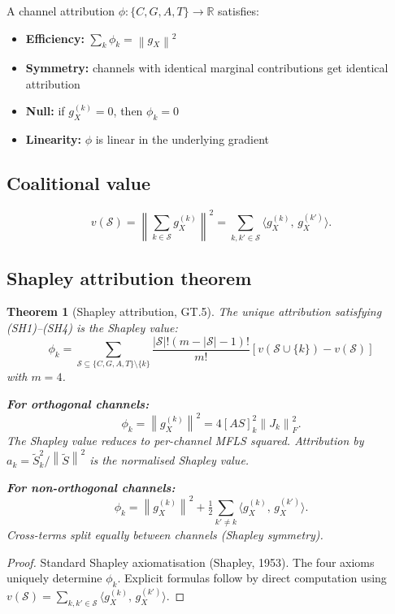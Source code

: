 \documentclass[11pt,a4paper]{article}
\newtheorem{theorem}{Theorem}[section]
\theoremstyle{definition}
\newcommand{\R}{\mathbb{R}}
\newcommand{\norm}[1]{\left\|#1\right\|}
\newcommand{\inner}[2]{\langle #1,\,#2\rangle}
\newcommand{\gX}{g_X}
\newcommand{\half}{\tfrac{1}{2}}
\begin{document}
A channel attribution $\phi: \{C,G,A,T\}\to\R$ satisfies:

\begin{itemize}
\item[(SH1)] \textbf{Efficiency:} $\sum_k\phi_k = \norm{\gX}^2$
\item[(SH2)] \textbf{Symmetry:} channels with identical marginal contributions get identical attribution
\item[(SH3)] \textbf{Null:} if $g_X^{(k)} = 0$, then $\phi_k = 0$
\item[(SH4)] \textbf{Linearity:} $\phi$ is linear in the underlying gradient
\end{itemize}

\subsection{Coalitional value}

\[
v(\mathcal{S}) = \norm{\sum_{k\in\mathcal{S}} g_X^{(k)}}^2 = \sum_{k,k'\in\mathcal{S}}\inner{g_X^{(k)}}{g_X^{(k')}}.
\]

\subsection{Shapley attribution theorem}

\begin{theorem}[Shapley attribution, GT.5]
The unique attribution satisfying (SH1)--(SH4) is the Shapley value:
\[
\phi_k = \sum_{\mathcal{S}\subseteq\{C,G,A,T\}\setminus\{k\}}\frac{|\mathcal{S}|!(m-|\mathcal{S}|-1)!}{m!}[v(\mathcal{S}\cup\{k\}) - v(\mathcal{S})]
\]
with $m=4$.

\textbf{For orthogonal channels:}
\[
\phi_k = \norm{g_X^{(k)}}^2 = 4[AS]_k^2\norm{J_k}_F^2.
\]
The Shapley value reduces to per-channel MFLS squared.
Attribution by $a_k = \tilde S_k^2/\norm{\tilde S}^2$ is the normalised Shapley value.

\textbf{For non-orthogonal channels:}
\[
\phi_k = \norm{g_X^{(k)}}^2 + \half\sum_{k'\neq k}\inner{g_X^{(k)}}{g_X^{(k')}}.
\]
Cross-terms split equally between channels (Shapley symmetry).
\end{theorem}

\begin{proof}
Standard Shapley axiomatisation (Shapley, 1953). The four axioms uniquely determine $\phi_k$.
Explicit formulas follow by direct computation using $v(\mathcal{S}) = \sum_{k,k'\in\mathcal{S}}\inner{g_X^{(k)}}{g_X^{(k')}}$.
\end{proof}
\end{document}

